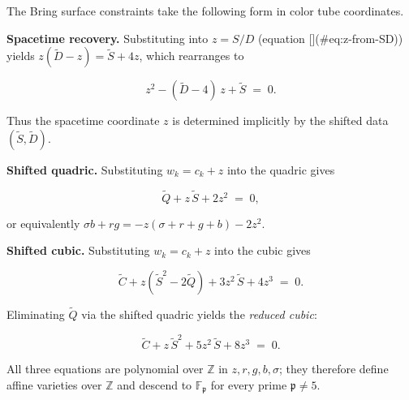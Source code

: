 \begin{remark}
  \label{rem:color-tube-constraints}
The Bring surface constraints take the following form in color tube coordinates.

\textbf{Spacetime recovery.}
Substituting into $z = S/D$
(equation [](#eq:z-from-SD)) yields $z(\widetilde{D} - z) = \widetilde{S} + 4z$,
which rearranges to

\begin{equation}\label{eq:spacetime-recovery}
  z^2 - (\widetilde{D} - 4)\,z + \widetilde{S} \;=\; 0.
\end{equation}

Thus the spacetime coordinate $z$ is determined implicitly by the
shifted data $(\widetilde{S}, \widetilde{D})$.

\textbf{Shifted quadric.}
Substituting $w_k = c_k + z$ into the quadric gives

\begin{equation}\label{eq:shifted-quadric}
  \widetilde{Q} + z\,\widetilde{S} + 2z^2 \;=\; 0,
\end{equation}

or equivalently $\sigma b + rg = -z(\sigma + r + g + b) - 2z^2$.

\textbf{Shifted cubic.}
Substituting $w_k = c_k + z$ into the cubic gives

\begin{equation}\label{eq:shifted-cubic}
  \widetilde{C} + z(\widetilde{S}^2 - 2\widetilde{Q})
  + 3z^2\,\widetilde{S} + 4z^3 \;=\; 0.
\end{equation}

Eliminating $\widetilde{Q}$ via the shifted quadric yields the
\emph{reduced cubic}:

\begin{equation}\label{eq:reduced-cubic}
  \widetilde{C} + z\,\widetilde{S}^2 + 5z^2\,\widetilde{S} + 8z^3 \;=\; 0.
\end{equation}

All three equations are polynomial over $\mathbb{Z}$ in $z, r, g, b, \sigma$;
they therefore define affine varieties over $\mathbb{Z}$ and descend
to $\mathbb{F}_\mathfrak{p}$ for every prime $\mathfrak{p} \ne 5$.
\end{remark}

